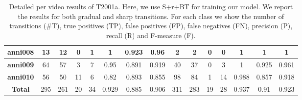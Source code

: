 \documentclass[journal]{IEEEtran}
\begin{document}
\begin{table*}[h]
\begin{tabular}{|c|c|c|c|c|c|c|c|c|c|c|c|c|c|c|}
\textbf{anni008}    & 13            & 12          & 0           & 1           & 1          & 0.923      & 0.96       & 2             & 2           & 0           & 0           & 1          & 1          & 1          \\ \hline
\textbf{anni009}    & 64            & 57          & 3           & 7           & 0.95       & 0.891      & 0.919      & 40            & 37          & 0           & 3           & 1          & 0.925      & 0.961      \\ \hline
\textbf{anni010}    & 56            & 50          & 11          & 6           & 0.82       & 0.893      & 0.855      & 98            & 84          & 1           & 14          & 0.988      & 0.857      & 0.918      \\ \hline
\textbf{Total}       & 295           & 261         & 20          & 34          & 0.929      & 0.885      & 0.906      & 311           & 283         & 19          & 28          & 0.937      & 0.91       & 0.923      \\ \hline
\end{tabular}
\caption{Detailed per video results of T2001a. Here, we use S+r+BT for training our model. We report the results for both gradual and sharp transitions. For each class we show the number of transitions (\#T), true positives (TP), false positives (FP), false negatives (FN), precision (P), recall (R) and F-measure (F).}
\label{2001a_06}
\end{table*}
\end{document}
